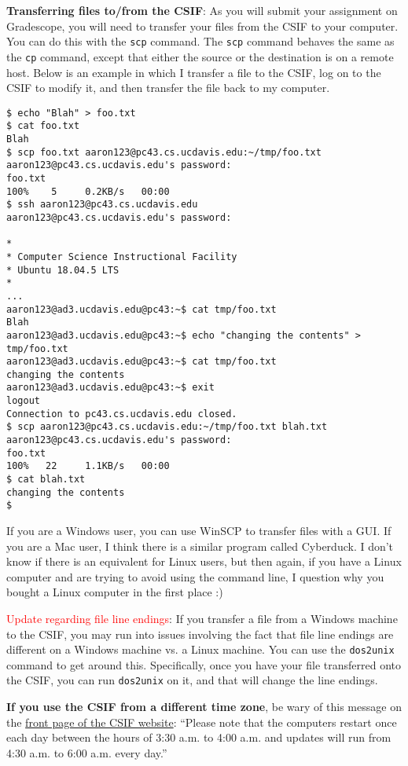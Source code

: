\documentclass{article}
\begin{document}
\textbf{Transferring files to/from the CSIF}: As you will submit your assignment on Gradescope, you will need to transfer your files from the CSIF to your computer. You can do this with the \lstinline{scp} command. The \lstinline{scp} command behaves the same as the \lstinline{cp} command, except that either the source or the destination is on a remote host. Below is an example in which I transfer a file to the CSIF, log on to the CSIF to modify it, and then transfer the file back to my computer.

\begin{lstlisting}
$ echo "Blah" > foo.txt
$ cat foo.txt 
Blah
$ scp foo.txt aaron123@pc43.cs.ucdavis.edu:~/tmp/foo.txt
aaron123@pc43.cs.ucdavis.edu's password: 
foo.txt                                                            100%    5     0.2KB/s   00:00    
$ ssh aaron123@pc43.cs.ucdavis.edu
aaron123@pc43.cs.ucdavis.edu's password: 

*
* Computer Science Instructional Facility
* Ubuntu 18.04.5 LTS
*
...
aaron123@ad3.ucdavis.edu@pc43:~$ cat tmp/foo.txt 
Blah
aaron123@ad3.ucdavis.edu@pc43:~$ echo "changing the contents" > tmp/foo.txt 
aaron123@ad3.ucdavis.edu@pc43:~$ cat tmp/foo.txt 
changing the contents
aaron123@ad3.ucdavis.edu@pc43:~$ exit
logout
Connection to pc43.cs.ucdavis.edu closed.
$ scp aaron123@pc43.cs.ucdavis.edu:~/tmp/foo.txt blah.txt
aaron123@pc43.cs.ucdavis.edu's password: 
foo.txt                                                            100%   22     1.1KB/s   00:00    
$ cat blah.txt 
changing the contents
$ 
\end{lstlisting}

If you are a Windows user, you can use WinSCP to transfer files with a GUI. If you are a Mac user, I think there is a similar program called Cyberduck. I don't know if there is an equivalent for Linux users, but then again, if you have a Linux computer and are trying to avoid using the command line, I question why you bought a Linux computer in the first place :)

\textcolor{red}{Update regarding file line endings}: If you transfer a file from a Windows machine to the CSIF, you may run into issues involving the fact that file line endings are different on a Windows machine vs. a Linux machine. You can use the \lstinline{dos2unix} command to get around this. Specifically, once you have your file transferred onto the CSIF, you can run \lstinline{dos2unix} on it, and that will change the line endings.

\textbf{If you use the CSIF from a different time zone}, be wary of this message on the \href{http://csifdocs.cs.ucdavis.edu/home}{front page of the CSIF website}: ``Please note that the computers restart once each day between the hours of 3:30 a.m. to 4:00 a.m. and updates will run from 4:30 a.m. to 6:00 a.m. every day.''
\end{document}
